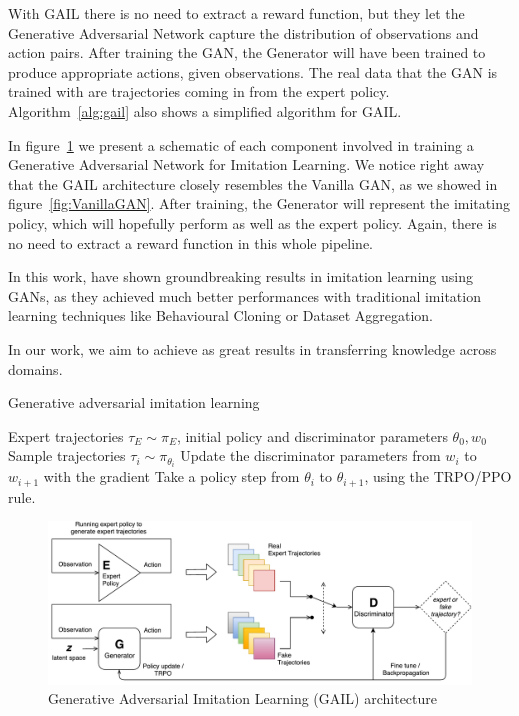 With GAIL there is no need to extract a reward function, but they let the Generative Adversarial Network capture the distribution of observations and action pairs. After training the GAN, the Generator will have been trained to produce appropriate actions, given observations. The real data that the GAN is trained with are trajectories coming in from the expert policy. Algorithm~\ref{alg:gail} also shows a simplified algorithm for GAIL.

In figure~\ref{fig:GAIL-GAN} we present a schematic of each component involved in training a Generative Adversarial Network for Imitation Learning. We notice right away that the GAIL architecture closely resembles the Vanilla GAN, as we showed in figure~\ref{fig:VanillaGAN}. After training, the Generator will represent the imitating policy, which will hopefully perform as well as the expert policy. Again, there is no need to extract a reward function in this whole pipeline.

In this work, \citeauthor{ho2016generative} have shown groundbreaking results in imitation learning using GANs, as they achieved much better performances with traditional imitation learning techniques like Behavioural Cloning or Dataset Aggregation.

In our work, we aim to achieve as great results in transferring knowledge across domains.

\begin{algorithm}[tb]
    \caption{Generative adversarial imitation learning}
    \label{alg:gail}
    \begin{algorithmic}[1]
        Expert trajectories $\tau_E \sim \pi_E$, initial policy and discriminator parameters $\theta_0, w_0$
           \State Sample trajectories $\tau_i \sim \pi_{\theta_i}$
           \State Update the discriminator parameters from $w_i$ to $w_{i+1}$ with the gradient
           \State Take a policy step from $\theta_i$ to $\theta_{i+1}$, using the TRPO/PPO rule.
        \EndFor
    \end{algorithmic}
\end{algorithm}

\begin{figure}
\centering
\includegraphics[width=15cm]{Figures/GAIL-GAN}
\caption{Generative Adversarial Imitation Learning (GAIL) architecture}
\label{fig:GAIL-GAN}
\end{figure}%